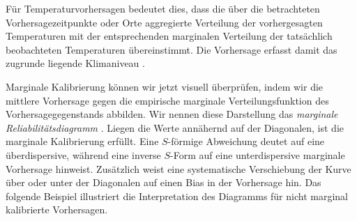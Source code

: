 Für Temperaturvorhersagen bedeutet dies, dass die über die betrachteten Vorhersagezeitpunkte oder Orte aggregierte Verteilung der vorhergesagten Temperaturen mit der entsprechenden marginalen Verteilung der tatsächlich beobachteten Temperaturen übereinstimmt. Die Vorhersage erfasst damit das zugrunde liegende Klimaniveau \parencite{Gneiting2007}.

Marginale Kalibrierung können wir jetzt visuell überprüfen, indem wir die mittlere Vorhersage gegen die empirische marginale Verteilungsfunktion des Vorhersagegegenstands abbilden. Wir nennen diese Darstellung das \emph{marginale Reliabilitätsdiagramm} \parencite[B.3]{gneiting2023regression}. Liegen die Werte annähernd auf der Diagonalen, ist die marginale Kalibrierung erfüllt. Eine $S$-förmige Abweichung deutet auf eine überdispersive, während eine inverse $S$-Form auf eine unterdispersive marginale Vorhersage hinweist. Zusätzlich weist eine systematische Verschiebung der Kurve über oder unter der Diagonalen auf einen Bias in der Vorhersage hin. Das folgende Beispiel illustriert die Interpretation des Diagramms für  nicht marginal kalibrierte Vorhersagen.


